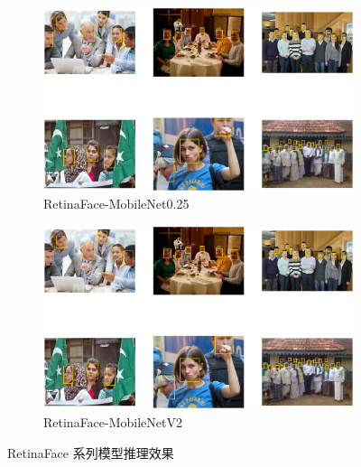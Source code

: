 \documentclass{article}
\begin{document}
\begin{figure}[htbp]
    \centering
    \begin{subfigure}[b]{0.48\textwidth}
        \includegraphics[width=\textwidth]{imgs/infer_result/retinaface_mv1_0.25.jpg}
        \caption{RetinaFace-MobileNet0.25}
    \end{subfigure}
    \hfill
    \begin{subfigure}[b]{0.48\textwidth}
        \includegraphics[width=\textwidth]{imgs/infer_result/retinaface_mv2.jpg}
        \caption{RetinaFace-MobileNetV2}
    \end{subfigure}
    \caption{RetinaFace 系列模型推理效果}
    \label{fig:infer_retinaface}
\end{figure}
\end{document}
